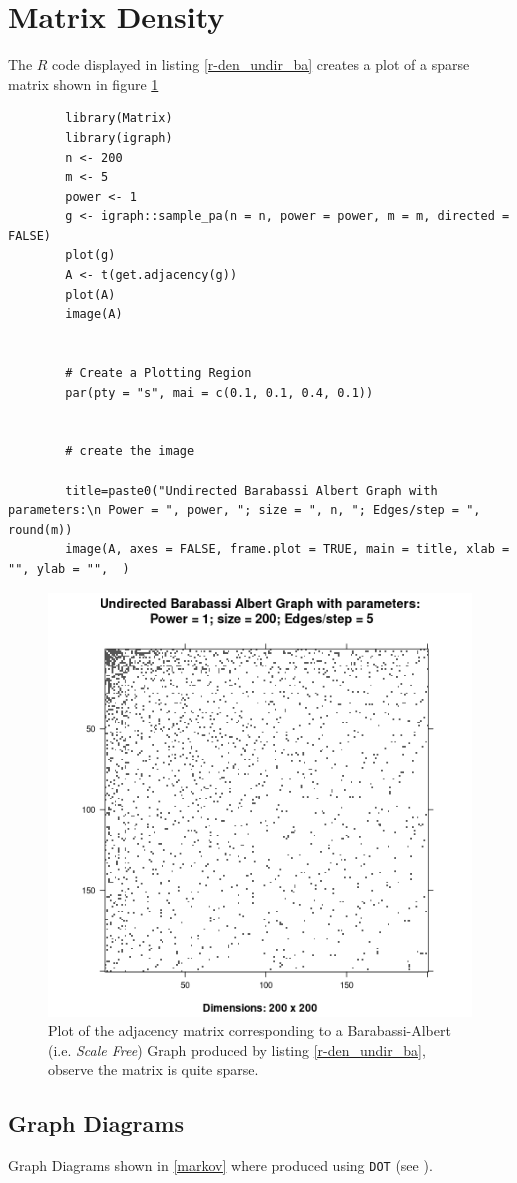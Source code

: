 \documentclass[11pt]{report}
\begin{document}
\section{Matrix Density}
The \(\mathbf{\mathit{R}}\) code displayed in listing \ref{r-den_undir_ba} creates a plot of a sparse matrix shown in figure \ref{fig:den_undir_ba}
\begin{listing}[htbp]
    \begin{tcolorbox}
        \begin{verbatim}
        library(Matrix)
        library(igraph)
        n <- 200
        m <- 5
        power <- 1
        g <- igraph::sample_pa(n = n, power = power, m = m, directed = FALSE)
        plot(g)
        A <- t(get.adjacency(g))
        plot(A)
        image(A)


        # Create a Plotting Region
        par(pty = "s", mai = c(0.1, 0.1, 0.4, 0.1))


        # create the image

        title=paste0("Undirected Barabassi Albert Graph with parameters:\n Power = ", power, "; size = ", n, "; Edges/step = ", round(m))
        image(A, axes = FALSE, frame.plot = TRUE, main = title, xlab = "", ylab = "",  )
        \end{verbatim}
    \end{tcolorbox}
\caption{\label{r-den_undir_ba}\textbf{\emph{R}} code to produce an image illustrating the density of a simulated Barabasi-Albert graph, the \emph{Barabasi-Albert} graph is a good analouge for the link structure of the internet \cite{langvilleGooglePageRankScience2012,barabasiPhysicsWeb2001,barabasiScalefreeCharacteristicsRandom2000} see the output in figure \ref{fig:den_undir_ba}}
\end{listing}

\begin{figure}[htbp]
\centering
\includegraphics[width=12cm]{media/DensityUndirectedBA.png}
\caption{\label{fig:den_undir_ba}Plot of the adjacency matrix corresponding to a Barabassi-Albert (i.e. \emph{Scale Free}) Graph produced by listing \ref{r-den_undir_ba}, observe the matrix is quite sparse.}
\end{figure}
\subsection{Graph Diagrams}
\label{sec:orgc4aeb84}
Graph Diagrams shown in \ref{markov} where produced using \texttt{DOT} (see \cite{DOTLanguage,DOTGraphDescription2020}).
\end{document}
